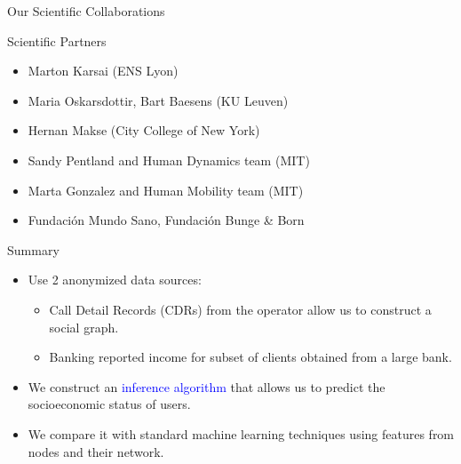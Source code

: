 \documentclass[usenames,dvipsnames]{beamer}
\begin{document}
\begin{frame}{Our Scientific Collaborations}
\begin{block}{Scientific Partners}
\begin{itemize}
\item Marton Karsai (ENS Lyon)
\medskip
\item Maria Oskarsdottir, Bart Baesens (KU Leuven)
\medskip
\item Hernan Makse (City College of New York) 
\medskip
\item Sandy Pentland and Human Dynamics team (MIT)
\item Marta Gonzalez and Human Mobility team (MIT)
\medskip
\item Fundación Mundo Sano, Fundación Bunge \& Born
\end{itemize}
\end{block}


{\tiny 
\nocite{leo2015socioeconomic}
\nocite{sarraute2015city}
\nocite{sarraute2014}
}
\end{frame}


\begin{frame}{Summary}

\begin{itemize}

\begin{block}{Objective}
Compare methods for \textbf{inference of socioeconomic status} \\
in a communication graph.
\end{block}
\medskip

\pause

\item Use 2 anonymized data sources:
\begin{itemize}
\item Call Detail Records (CDRs) from the operator allow us to construct a social graph.
\item Banking reported income for subset of clients obtained from a large bank.
\end{itemize} 

\item We construct an \textcolor{blue}{inference algorithm} that allows us to predict the socioeconomic status of users.

\item We compare it with standard machine learning techniques using features from nodes and their network.

\end{itemize}

\end{frame}
\end{document}
